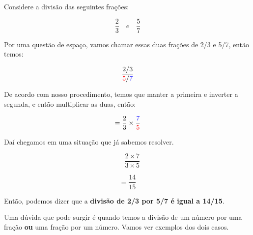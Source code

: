 \begin{exemplo}
    Considere a divisão das seguintes frações:

    \begin{equation}
        \frac{2}{3} \quad e \quad \frac{5}{7}
    \end{equation}
    
    Por uma questão de espaço, vamos chamar essas duas frações de 2/3 e 5/7, então temos:
    
    \begin{equation}
        \frac{2/3}{\textcolor{red}{5}/\textcolor{blue}{7}}
    \end{equation}

    De acordo com nosso procedimento, temos que manter a primeira e inverter a segunda, e então multiplicar as duas, então:

    \begin{equation}
        =\frac{2}{3}\times\frac{\textcolor{blue}{7}}{\textcolor{red}{5}}
    \end{equation}

    Daí chegamos em uma situação que já sabemos resolver.

    \begin{equation}
        =\frac{2\times7}{3\times5}
    \end{equation}

    \begin{equation}
        =\frac{14}{15}
    \end{equation}

    Então, podemos dizer que a \textbf{divisão de 2/3 por 5/7 é igual a 14/15}.
\end{exemplo}

Uma dúvida que pode surgir é quando temos a divisão de um número por uma fração \textbf{ou} uma fração por um número. Vamos ver exemplos dos dois casos.

